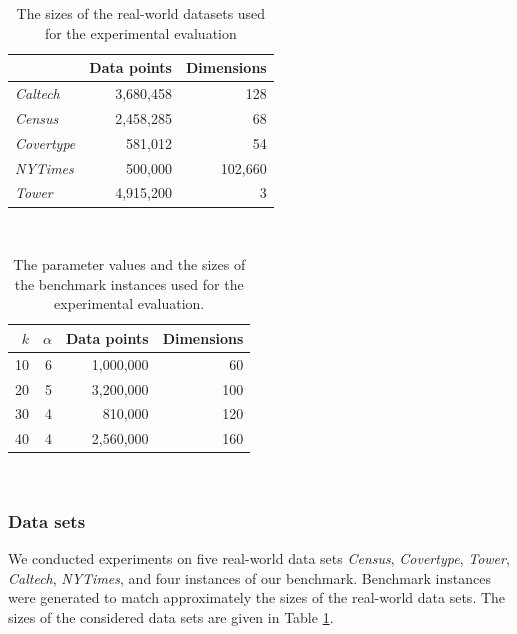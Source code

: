 \begin{table}
	\begin{center}%
	\begin{tabular}{lrr}
		\toprule
        
		    & Data points
		    & Dimensions
            \\
		\midrule
		\textit{Caltech}
    		& 3,680,458
    		& 128
    		\\
		\textit{Census}
    		& 2,458,285
    		& 68
    		\\
	    \textit{Covertype}
    	    & 581,012
    		& 54
    		\\
	    \textit{NYTimes}
    	    & 500,000
    		& 102,660
    		\\
        \textit{Tower}
            & 4,915,200
    		& 3
    		\\
		\bottomrule
	\end{tabular}\\
	\caption{The sizes of the real-world datasets used for the experimental evaluation}
	\label{tab:real-world-datasets-overview}
	\end{center}
\end{table}



\begin{table}
	\begin{center}
	\begin{tabular}{rrrr}
		\toprule
        $k$
		    & $\alpha$
		    & Data points
		    & Dimensions
            \\
		\midrule
        10
    		& 6
    		& 1,000,000
    		& 60
    		\\
        20
    		& 5
    		& 3,200,000
    		& 100
    		\\
        30
    		& 4
    		& 810,000
    		& 120
    		\\
        40
    		& 4
    		& 2,560,000
    		& 160
    		\\
		\bottomrule
	\end{tabular}\\
	\end{center}
    \caption{The parameter values and the sizes of the benchmark instances used for the experimental evaluation.}
	\label{tab:benchmark-instances-overview}
\end{table}



\subsubsection*{Data sets}
We conducted experiments on five real-world data sets
\textit{Census},
\textit{Covertype},
\textit{Tower},
\textit{Caltech},
\textit{NYTimes},
and four instances of our benchmark. Benchmark instances were generated to match approximately the sizes of the real-world data sets. 
The sizes of the considered data sets are given in Table \ref{tab:real-world-datasets-overview}.

